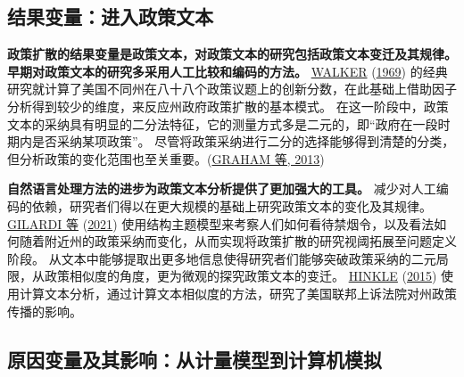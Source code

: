 \documentclass[
  12pt,
]{ctexart}
\begin{document}
\hypertarget{ux7ed3ux679cux53d8ux91cfux8fdbux5165ux653fux7b56ux6587ux672c}{%
\subsection{结果变量：进入政策文本}\label{ux7ed3ux679cux53d8ux91cfux8fdbux5165ux653fux7b56ux6587ux672c}}

\textbf{政策扩散的结果变量是政策文本，对政策文本的研究包括政策文本变迁及其规律。}
\textbf{早期对政策文本的研究多采用人工比较和编码的方法。}
\protect\hyperlink{ref-Walker1969}{WALKER} (\protect\hyperlink{ref-Walker1969}{1969}) 的经典研究就计算了美国不同州在八十八个政策议题上的创新分数，在此基础上借助因子分析得到较少的维度，来反应州政府政策扩散的基本模式。
在这一阶段中，政策文本的采纳具有明显的二分法特征，它的测量方式多是二元的，即``政府在一段时期内是否采纳某项政策''。
尽管将政策采纳进行二分的选择能够得到清楚的分类，但分析政策的变化范围也至关重要。(\protect\hyperlink{ref-GrahamEtAl2013}{GRAHAM 等, 2013})

\textbf{自然语言处理方法的进步为政策文本分析提供了更加强大的工具。}
减少对人工编码的依赖，研究者们得以在更大规模的基础上研究政策文本的变化及其规律。
\protect\hyperlink{ref-GilardiEtAl2021}{GILARDI 等} (\protect\hyperlink{ref-GilardiEtAl2021}{2021}) 使用结构主题模型来考察人们如何看待禁烟令，以及看法如何随着附近州的政策采纳而变化，从而实现将政策扩散的研究视阈拓展至问题定义阶段。
从文本中能够提取出更多地信息使得研究者们能够突破政策采纳的二元局限，从政策相似度的角度，更为微观的探究政策文本的变迁。
\protect\hyperlink{ref-Hinkle2015}{HINKLE} (\protect\hyperlink{ref-Hinkle2015}{2015}) 使用计算文本分析，通过计算文本相似度的方法，研究了美国联邦上诉法院对州政策传播的影响。

\hypertarget{ux539fux56e0ux53d8ux91cfux53caux5176ux5f71ux54cdux4eceux8ba1ux91cfux6a21ux578bux5230ux8ba1ux7b97ux673aux6a21ux62df}{%
\subsection{原因变量及其影响：从计量模型到计算机模拟}\label{ux539fux56e0ux53d8ux91cfux53caux5176ux5f71ux54cdux4eceux8ba1ux91cfux6a21ux578bux5230ux8ba1ux7b97ux673aux6a21ux62df}}
\end{document}
